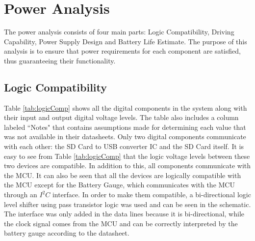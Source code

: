 \section{Power Analysis}
The power analysis consists of four main parts: Logic Compatibility, Driving Capability, Power Supply Design and Battery Life Estimate. The purpose of this analysis is to ensure that power requirements for each component are satisfied, thus guaranteeing their functionality.

\subsection{Logic Compatibility}

Table \ref{tab:logicComp} shows all  the digital components in the system along with their input and output digital voltage levels.  The table also includes a column labeled ``Notes" that contains assumptions made for determining each value that was not available in their datasheets.  Only two digital components communicate with each other: the SD Card to USB converter IC and the SD Card itself.  It is easy to see from Table \ref{tab:logicComp} that the logic voltage levels between these two devices are compatible.  In addition to this, all components communicate with the MCU.  It can also be seen that all the devices are logically compatible with the MCU except for the Battery Gauge, which communicates with the MCU through an $I^2C$ interface.  In order to make them compatible, a bi-directional logic level shifter using pass transistor logic was used and can be seen in the schematic.  The interface was only added in the data lines because it is bi-directional, while the clock signal comes from the MCU and can be correctly interpreted by the battery gauge according to the datasheet.


